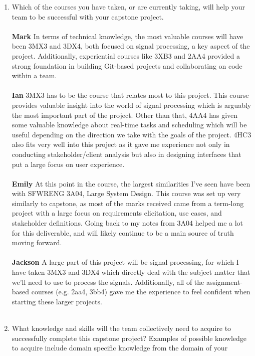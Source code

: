 \begin{enumerate}
  \item Which of the courses you have taken, or are currently taking, will help
  your team to be successful with your capstone project. \\ \\
  \textbf{Mark} In terms of technical knowledge, the most valuable courses will have been 3MX3 and 3DX4, both focused on signal processing, a key aspect of the project. Additionally, experiential courses like 3XB3 and 2AA4 provided a strong foundation in building Git-based projects and collaborating on code within a team. \\ \\
  \textbf{Ian} 3MX3 has to be the course that relates most to this project. This course provides valuable insight into the world of signal processing which is arguably the most important part of the project. Other than that, 4AA4 has given some valuable knowledge about real-time tasks and scheduling which will be useful depending on the direction we take with the goals of the project. 4HC3 also fits very well into this project as it gave me experience not only in conducting stakeholder/client analysis but also in designing interfaces that put a large focus on user experience. \\ \\
  \textbf{Emily} At this point in the course, the largest similarities I’ve seen have been with SFWRENG 3A04, Large System Design. This course was set up very similarly to capstone, as most of the marks received came from a term-long project with a large focus on requirements elicitation, use cases, and stakeholder definitions. Going back to my notes from 3A04 helped me a lot for this deliverable, and will likely continue to be a main source of truth moving forward.\\ \\
  \textbf{Jackson} A large part of this project will be signal processing, for which I have taken 3MX3 and 3DX4 which directly deal with the subject matter that we’ll need to use to process the signals. Additionally, all of the assignment-based courses (e.g. 2aa4, 3bb4) gave me the experience to feel confident when starting these larger projects. \\ \\
  \item What knowledge and skills will the team collectively need to acquire to
  successfully complete this capstone project?  Examples of possible knowledge
  to acquire include domain specific knowledge from the domain of your

\end{enumerate}

